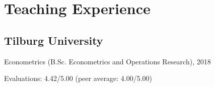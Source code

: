 \documentclass[12pt,letterpaper]{report}
\newcommand{\listitemspace}{0.15em}
\renewenvironment{itemize}
{\begin{list}{}{\setlength{\leftmargin}{0em}
            \setlength{\parskip}{0em}
            \setlength{\itemsep}{\listitemspace}
            \setlength{\parsep}{\listitemspace}}}
    {\end{list}}
\begin{document}
    \section*{Teaching Experience}

    \subsection*{Tilburg University}
    
    \begin{itemize}
    	
    	\item Econometrics (B.Sc. Econometrics and Operations Research), 2018
    	\item Evaluations: 4.42/5.00 (peer average: 4.00/5.00)
    
	\end{itemize}
    	
%
%
%
%
%
%
%
%
%
%
%
\end{document}
